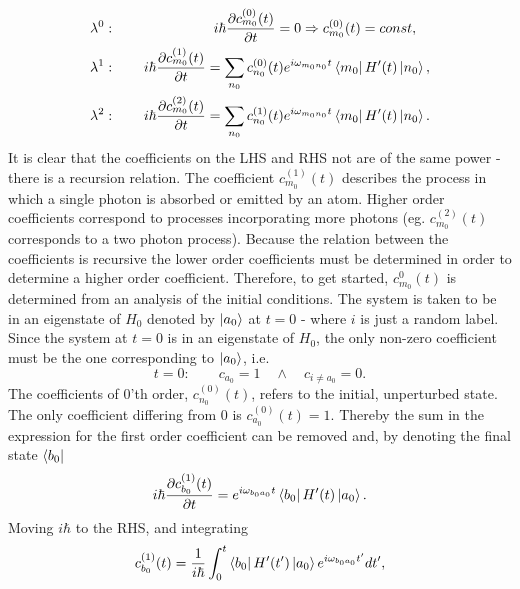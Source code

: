 \begin{equation}
	\begin{split}
		&\lambda^0:\qquad \qquad \qquad \quad i\hbar\frac{\partial c^{(0)}_{m_0}(t)}{\partial t}=0\Rightarrow c^{(0)}_{m_0}(t)=const,\\
		&\lambda^1:\qquad i\hbar\frac{\partial c^{(1)}_{m_0}(t)}{\partial t}=\sum_{n_0}^{}c^{(0)}_{n_0}(t) e^{i\omega_{m_0n_0}t}\bra{m_0}H'(t)\ket{n_0},\\
		&\lambda^2:\qquad i\hbar\frac{\partial c^{(2)}_{m_0}(t)}{\partial t}=\sum_{n_0}^{}c^{(1)}_{n_0}(t) e^{i\omega_{m_0n_0}t}\bra{m_0}H'(t)\ket{n_0}.\\
	\end{split}	
	\label{c2}
\end{equation} 
It is clear that the coefficients on the LHS and RHS not are of the same power - there is a recursion relation. The coefficient $c^{(1)}_{m_0}(t)$ describes the process in which a single photon is absorbed or emitted by an atom. Higher order coefficients correspond to processes incorporating more photons (eg. $c^{(2)}_{m_0}(t)$ corresponds to a two photon process). Because the relation between the coefficients is recursive the lower order coefficients must be determined in order to determine a higher order coefficient. Therefore, to get started, $c^0_{m_0}(t)$ is determined from an analysis of the initial conditions. The system is taken to be in an eigenstate of $H_0$ denoted by $\ket{a_0}$ at $t=0$ - where $i$ is just a random label. Since the system at $t=0$ is in an eigenstate of $H_0$, the only non-zero coefficient must be the one corresponding to $\ket{a_0}$,  i.e.
\begin{equation}
	t=0: \qquad c_{a_0}=1 \quad \wedge \quad c_{i\neq a_0}=0.
	\label{initial condition}
\end{equation} 
The coefficients of 0'th order, $c^{(0)}_{n_0}(t)$, refers to the initial, unperturbed state. The only coefficient differing from 0 is $c^{(0)}_{a_0}(t)=1$. Thereby the sum in the expression for the first order coefficient can be removed and, by denoting the final state $\bra{b_0}$
\begin{equation}
	i\hbar\frac{\partial c^{(1)}_{b_0}(t)}{\partial t}=e^{i\omega_{b_0a_0}t}\bra{b_0}H'(t)\ket{a_0}.
\end{equation} 
Moving $i\hbar$ to the RHS, and integrating
\begin{equation}
	c^{(1)}_{b_0}(t)=\frac{1}{i\hbar}\int_{0}^{t}\bra{b_0}H'(t')\ket{a_0}e^{i\omega_{b_0a_0}t'}dt',
	\label{coef}
\end{equation} 
